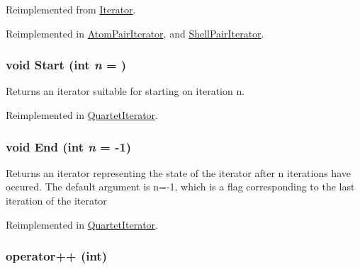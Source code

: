 Reimplemented from \hyperlink{classJKBuilder_1_1Iterator_ae6f4f24e1855d2aaf89a8a60a9f1521b}{Iterator}.

Reimplemented in \hyperlink{classJKBuilder_1_1AtomPairIterator_aefda578091b26523e72740cec884aa45}{AtomPairIterator}, and \hyperlink{classJKBuilder_1_1ShellPairIterator_af3001050bade3a939d83971d1a3f47e7}{ShellPairIterator}.\hypertarget{classJKBuilder_1_1Iterator_a34ca36a99b20ae3170babadaffe51ed2}{
\subsubsection[{Start}]{\setlength{\rightskip}{0pt plus 5cm}void Start (int {\em n} = {})}}
\label{classJKBuilder_1_1Iterator_a34ca36a99b20ae3170babadaffe51ed2}


Returns an iterator suitable for starting on iteration n. 

Reimplemented in \hyperlink{classJKBuilder_1_1QuartetIterator_a34ca36a99b20ae3170babadaffe51ed2}{QuartetIterator}.\hypertarget{classJKBuilder_1_1Iterator_a5f692b73d2e160450f4617bb75825e11}{
\subsubsection[{End}]{\setlength{\rightskip}{0pt plus 5cm}void End (int {\em n} = {\ttfamily -\/1})}}
\label{classJKBuilder_1_1Iterator_a5f692b73d2e160450f4617bb75825e11}


Returns an iterator representing the state of the iterator after n iterations have occured. The default argument is n=-\/1, which is a flag corresponding to the last iteration of the iterator 

Reimplemented in \hyperlink{classJKBuilder_1_1QuartetIterator_a5f692b73d2e160450f4617bb75825e11}{QuartetIterator}.\hypertarget{classJKBuilder_1_1Iterator_ac1702aedba13b4112b891b58dfd78eba}{
\subsubsection[{operator++}]{ operator++ (int)}}
\label{classJKBuilder_1_1Iterator_ac1702aedba13b4112b891b58dfd78eba}


